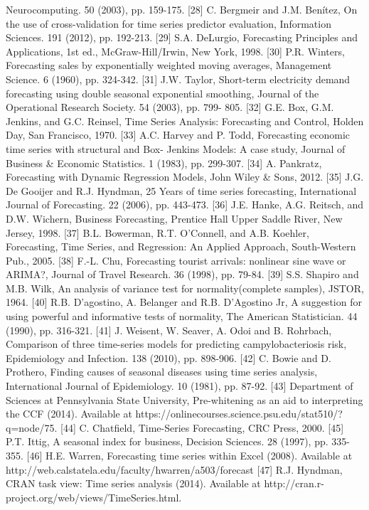         Neurocomputing. 50 (2003), pp. 159-175.
[28] C. Bergmeir and J.M. Benítez, On the use of cross-validation for time series predictor 
        evaluation, Information Sciences. 191 (2012), pp. 192-213.
[29] S.A. DeLurgio, Forecasting Principles and Applications, 1st ed., McGraw-Hill/Irwin, New York, 1998.
[30] P.R. Winters, Forecasting sales by exponentially weighted moving averages, 
        Management Science. 6 (1960), pp. 324-342.
[31] J.W. Taylor, Short-term electricity demand forecasting using double seasonal 
       exponential smoothing, Journal of the Operational Research Society. 54 (2003), pp. 799- 
       805.
[32] G.E. Box, G.M. Jenkins, and G.C. Reinsel, Time Series Analysis: Forecasting and Control, Holden Day, San Francisco, 1970.
[33] A.C. Harvey and P. Todd, Forecasting economic time series with structural and Box- 
       Jenkins Models: A case study, Journal of Business & Economic Statistics. 1 (1983), pp.  
       299-307.
[34] A. Pankratz, Forecasting with Dynamic Regression Models, John Wiley & Sons, 2012.
[35] J.G. De Gooijer and R.J. Hyndman, 25 Years of time series forecasting, International  
       Journal of Forecasting. 22 (2006), pp. 443-473.
[36] J.E. Hanke, A.G. Reitsch, and D.W. Wichern, Business Forecasting, Prentice Hall Upper Saddle River, New Jersey, 1998.
[37] B.L. Bowerman, R.T. O'Connell, and A.B. Koehler, Forecasting, Time Series, and Regression: An Applied Approach, South-Western Pub., 2005.
[38] F.-L. Chu, Forecasting tourist arrivals: nonlinear sine wave or ARIMA?, Journal of  
       Travel Research. 36 (1998), pp. 79-84.
[39] S.S. Shapiro and M.B. Wilk, An analysis of variance test for normality(complete samples), JSTOR, 1964.
[40] R.B. D'agostino, A. Belanger and R.B. D'Agostino Jr, A suggestion for using powerful 
       and informative tests of normality, The American Statistician. 44 (1990), pp. 316-321.
[41] J. Weisent, W. Seaver, A. Odoi and B. Rohrbach, Comparison of three time-series  
       models for predicting campylobacteriosis risk, Epidemiology and Infection. 138 (2010),   
       pp. 898-906.
[42] C. Bowie and D. Prothero, Finding causes of seasonal diseases using time series   
        analysis, International Journal of Epidemiology. 10 (1981), pp. 87-92.
[43] Department of Sciences at Pennsylvania State University, Pre-whitening as an aid to interpreting the CCF (2014). Available at
https://onlinecourses.science.psu.edu/stat510/?q=node/75.
[44] C. Chatfield, Time-Series Forecasting, CRC Press, 2000.
[45] P.T. Ittig, A seasonal index for business, Decision Sciences. 28 (1997), pp. 335-355.
[46] H.E. Warren, Forecasting time series within Excel (2008). Available at http://web.calstatela.edu/faculty/hwarren/a503/forecast%
[47] R.J. Hyndman, CRAN task view: Time series analysis (2014). Available at 
        http://cran.r-project.org/web/views/TimeSeries.html.

